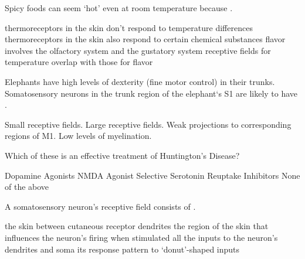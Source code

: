 \documentclass[answers]{exam}
\begin{document}
\begin{questions}
\question Spicy foods can seem `hot' even at room temperature because \fillin.
\begin{choices}
\choice thermoreceptors in the skin don't respond to temperature differences
\correctchoice thermoreceptors in the skin also respond to certain chemical substances
\choice flavor involves the olfactory system and the gustatory system
\choice receptive fields for temperature overlap with those for flavor
\end{choices}


\question Elephants have high levels of dexterity (fine motor control) in their trunks. Somatosensory neurons in the trunk region of the elephant`s S1 are likely to have \fillin.
\begin{choices}
\correctchoice Small receptive fields.
\choice Large receptive fields.
\choice Weak projections to corresponding regions of M1.
\choice Low levels of myelination.
\end{choices}

\question Which of these is an effective treatment of Huntington’s Disease?
\begin{choices}
\choice Dopamine Agonists
\choice NMDA Agonist
\choice Selective Serotonin Reuptake Inhibitors
\correctchoice None of the above
\end{choices}

\newpage

\question A somatosensory neuron's receptive field consists of \fillin.
\begin{choices}
\choice the skin between cutaneous receptor dendrites
\correctchoice the region of the skin that influences the neuron's firing when stimulated
\choice all the inputs to the neuron's dendrites and soma
\choice its response pattern to `donut'-shaped inputs
\end{choices}


\end{questions}
\end{document}

